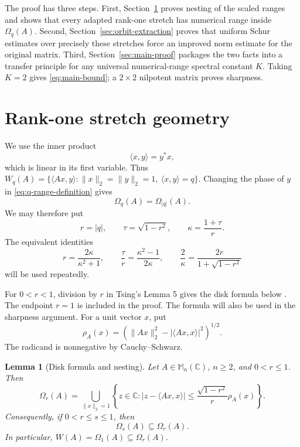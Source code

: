 \documentclass[preprints,article,submit,oneauthor]{Definitions/mdpi}
\newcounter{manuscriptresult}[section]
\theoremstyle{mdpi}
\newtheorem{lemma}[manuscriptresult]{Lemma}
\theoremstyle{definition}
\newcommand{\C}{\mathbb C}
\newcommand{\Mn}{\mathbb M_n(\C)}
\begin{document}
The proof has three steps.  First, Section~\ref{sec:similarity-geometry}
proves nesting of the scaled ranges and shows that every adapted
rank-one stretch has numerical range inside $\Omega_q(A)$.  Second,
Section~\ref{sec:orbit-extraction} proves that uniform Schur estimates
over precisely these stretches force an improved norm estimate for the
original matrix.  Third, Section~\ref{sec:main-proof} packages the two
facts into a transfer principle for any universal numerical-range
spectral constant $K$.  Taking $K=2$ gives \eqref{eq:main-bound}; a
$2\times2$ nilpotent matrix proves sharpness.

\section{Rank-one stretch geometry}
\label{sec:similarity-geometry}

We use the inner product
\[
 \langle x,y\rangle=y^*x,
\]
which is linear in its first variable.  Thus
$W_q(A)=\{\langle Ax,y\rangle:\lVert x\rVert_2=\lVert y\rVert_2=1,\
\langle x,y\rangle=q\}$.
Changing the phase of $y$ in \eqref{eq:q-range-definition} gives
\begin{equation}
 \Omega_q(A)=\Omega_{\lvert q\rvert}(A).
 \label{eq:phase-reduction}
\end{equation}
We may therefore put
\begin{equation}
 r=\lvert q\rvert,\qquad
 \tau=\sqrt{1-r^2},\qquad
 \kappa=\frac{1+\tau}{r}.
 \label{eq:parameter-normalization}
\end{equation}
The equivalent identities
\begin{equation}
 r=\frac{2\kappa}{\kappa^2+1},
 \qquad
 \frac\tau r=\frac{\kappa^2-1}{2\kappa},
 \qquad
 \frac2\kappa=\frac{2r}{1+\sqrt{1-r^2}}
 \label{eq:kappa-identities}
\end{equation}
will be used repeatedly.

For $0<r<1$, division by $r$ in Tsing's Lemma 5 gives the disk formula
below \cite{Tsing1984}.  The endpoint $r=1$ is included in the proof.
The formula will also be used in the sharpness argument.  For a unit
vector $x$, put
\[
 \rho_A(x)=
 \left(\lVert Ax\rVert_2^2-
       \lvert\langle Ax,x\rangle\rvert^2\right)^{1/2}.
\]
The radicand is nonnegative by Cauchy--Schwarz.

\begin{lemma}[Disk formula and nesting]
\label{lem:q-range-nesting}
Let $A\in\Mn$, $n\geq2$, and $0<r\leq1$.  Then
\begin{equation}
 \Omega_r(A)=
 \bigcup_{\lVert x\rVert_2=1}
 \left\{z\in\C:
  \lvert z-\langle Ax,x\rangle\rvert
  \leq\frac{\sqrt{1-r^2}}r\rho_A(x)\right\}.
 \label{eq:q-disk-formula}
\end{equation}
Consequently, if $0<r\leq s\leq1$, then
\[
 \Omega_s(A)\subseteq\Omega_r(A).
\]
In particular, $W(A)=\Omega_1(A)\subseteq\Omega_r(A)$.
\end{lemma}
\end{document}

